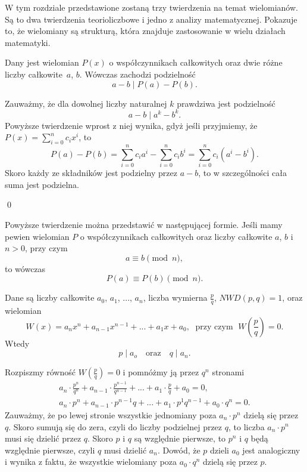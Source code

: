 

\noindent
W tym rozdziale przedstawione zostaną trzy twierdzenia na temat wielomianów. Są to dwa twierdzenia teorioliczbowe i jedno z analizy matematycznej. Pokazuje to, że wielomiany są strukturą, która znajduje zastosowanie w wielu działach matematyki.

\vspace{10px}

\noindent
Dany jest wielomian $P(x)$ o współczynnikach całkowitych oraz dwie różne liczby całkowite~$a$, $b$. Wówczas zachodzi podzielność
\[
	a - b \mid P(a) - P(b).
\]


\noindent
Zauważmy, że dla dowolnej liczby naturalnej $k$ prawdziwa jest podzielność
\[
	a - b \mid a^k - b^k.
\]
Powyższe twierdzenie wprost z niej wynika, gdyż jeśli przyjmiemy, że $P(x) = \sum^{n}_{i = 0} c_ix^i$, to
\[
	P(a) - P(b) = \sum^{n}_{i = 0} c_ia^i - \sum^{n}_{i = 0} c_ib^i = \sum^{n}_{i = 0} c_i(a^i - b^i).
\]
Skoro każdy ze składników jest podzielny przez $a - b$, to w szczególności cała suma jest podzielna.

\qed

\noindent
Powyższe twierdzenie można przedstawić w następującej formie. Jeśli mamy pewien wielomian $P$ o współczynnikach całkowitych oraz liczby całkowite $a$, $b$ i $n > 0$, przy czym
\[
	a \equiv b \pmod{n},
\]
to wówczas
\[
	P(a) \equiv P(b) \pmod{n}.
\]




\noindent
Dane są liczby całkowite $a_0$, $a_1$, ..., $a_n$, liczba wymierna $\frac{p}{q}$, $NWD(p, q) = 1$, oraz wielomian 
\[
	W(x) = a_nx^n + a_{n - 1}x^{n - 1} + ... + a_1x + a_0, \; \text{ przy czym } \; W\left(\frac{p}{q}\right) = 0.
\] 
 Wtedy
\[
	p \mid a_o \quad \text{oraz} \quad q \mid a_{n}.
\]


\noindent
Rozpiszmy równość $W\left(\frac{p}{q}\right) = 0$ i pomnóżmy ją przez $q^n$ stronami
\begin{align*}
	a_n \cdot \frac{p^n}{q^n} + a_{n - 1} \cdot \frac{p^{n - 1}}{q^{n - 1}} + ... + a_1 \cdot \frac{p}{q} + a_0 = 0, \\
	a_n \cdot p^n + a_{n - 1} \cdot p^{n-1}q + ... + a_1 \cdot p^1q^{n - 1} + a_0 \cdot q^n = 0.
\end{align*}
Zauważmy, że po lewej stronie wszystkie jednomiany poza $a_n \cdot p^n$ dzielą się przez $q$. Skoro sumują się do zera, czyli do liczby podzielnej przez $q$, to liczba $a_n \cdot p^n$ musi się dzielić przez $q$. Skoro $p$ i $q$ są względnie pierwsze, to $p^n$ i $q$ będą względnie pierwsze, czyli $q$ musi dzielić $a_n$. Dowód, że $p$ dzieli $a_0$ jest analogiczny i wynika z faktu, że wszystkie wielomiany poza $a_0 \cdot q^n$ dzielą się przez $p$.

